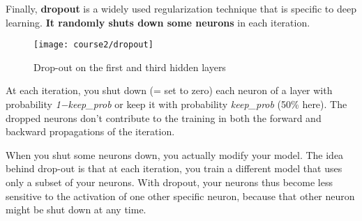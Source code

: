 \clearpage
{}

Finally, {\textbf {dropout}} is a widely used regularization technique that is specific to deep learning. {\textbf {It randomly shuts down some neurons}} in each iteration. 
\begin{figure}[h]
\begin{center}
\texttt{[image: course2/dropout]}
\caption{Drop-out on the first and third hidden layers}
\end{center}
\end{figure}

At each iteration, you shut down (= set to zero) each neuron of a layer with probability  \emph{1−keep\_prob}  or keep it with probability  \emph{keep\_prob} (50\% here). The dropped neurons don't contribute to the training in both the forward and backward propagations of the iteration.

When you shut some neurons down, you actually modify your model. The idea behind drop-out is that at each iteration, you train a different model that uses only a subset of your neurons. With dropout, your neurons thus become less sensitive to the activation of one other specific neuron, because that other neuron might be shut down at any time.



